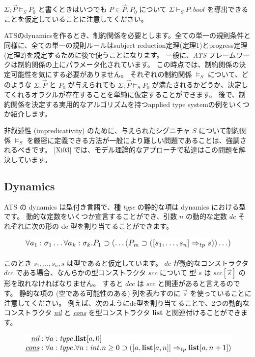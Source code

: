 \documentclass[submit,techreq,noauthor,onecolumn]{ipsj}
\begin{document}
\noindent $\Sigma; \vec{P} \models_S P_0$ と書くときはいつでも $P \in \vec{P},P_0$ について $\Sigma \vdash_S P : bool$ を導出できることを仮定していることに注意してください。

\noindent ATSのdynamicsを作るとき、制約関係を必要とします。全ての単一の規則条件と同様に、全ての単一の規則ルールはsubject reduction定理(定理1)とprogress定理(定理2)を規定するために後で使うことになります。
一般に、{\it ATS} フレームワークは制約関係の上にパラメータ化されています。
この時点では、制約関係の決定可能性を気にする必要がありません。
それぞれの制約関係 $\models_S$ について、どのような $\Sigma, \vec{P}$ と $P_0$ が与えられても $\Sigma; \vec{P} \models_S P_0$ が満たされるかどうか、決定してくれるオラクルが存在することを単純に仮定することができます。
後で、制約関係を決定する実用的なアルゴリズムを持つapplied type systemの例をいくつか紹介します。

非叙述性 (impredicativity) のために、与えられたシグニチャ $S$ について制約関係 $\models_S$ を厳密に定義できる方法が一般により難しい問題であることは、強調されるべきです。
[Xi03] では、モデル理論的なアプローチで私達はこの問題を解決しています。


\subsection{Dynamics}

ATS の dynamics は型付き言語で、種 {\it type} の静的な項は dynamics における型です。
動的な定数をいくつか宣言することができ、引数 $n$ の動的な定数 $dc$ それぞれに次の形の dc 型を割り当てることができます。

\begin{figure}[h]
\centering
\includegraphics[width=14cm]{img/infig22_dc-type.png}
\end{figure}

\noindent このとき $s_1,\ldots,s_n,s$ は型であると仮定しています。
$dc$ が動的なコンストラクタ $dcc$ である場合、なんらかの型コンストラクタ $scc$ について 型 $s$ は $scc[\vec{s}]$ の形を取れなければなりません。
すると $dcc$ は $scc$ と関連があると言えるのです。
静的な項の (空である可能性のある) 列を表わすのに $\vec{s}$ を使っていることに注意してください。
例えば、次のようにdc型を割り当てることで、2つの動的なコンストラクタ {\it \underline{nil}} と {\it \underline{cons}} を型コンストラクタ {\bf list} と関連付けることができます。

\begin{figure}[h]
\centering
\includegraphics[width=14cm]{img/infig22_nil_cons.png}
\end{figure}
\end{document}
